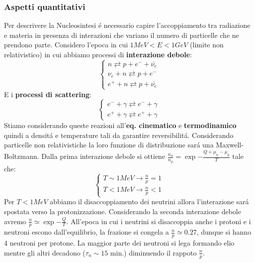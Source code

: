 \documentclass[12pt, a4paper]{article}
\begin{document}
\subsubsection{Aspetti quantitativi}
Per descrivere la Nucleosintesi \'{e} necessario capire l'accoppiamento tra radiazione e materia in presenza di interazioni che variano il numero di particelle che ne prendono parte. Considero l'epoca in cui $1MeV<E<1GeV$ (limite non relativistico) in cui abbiamo processi di \textbf{interazione debole}:
\begin{equation}
    \begin{cases}
    n \rightleftarrows p + e^{-} + \bar{\nu_e}
    \\
    \nu_{e}+n \rightleftarrows p +e^{-}
    \\
    e^{+} + n\rightleftarrows p + \bar{\nu_e}
    \end{cases}
\end{equation}
E i \textbf{processi di scattering}:
\begin{equation}
    \begin{cases}
    e^{-} + \gamma \rightleftarrows e^{-} + \gamma
    \\
    e^{+} + \gamma \rightleftarrows e^{+} + \gamma
    \end{cases}
\end{equation}
Stiamo considerando queste reazioni all'\textbf{eq. cinematico} e \textbf{termodinamico} quindi a densit\'{a} e temperature tali da garantire reversibilit\'{a}. Considerando particelle non relativistiche la loro funzione di distribuzione sar\'{a} una Maxwell-Boltzmann. Dalla prima interazione debole si ottiene $\frac{n_n}{n_p} = \exp{-\frac{Q + \mu_n -\mu_p}{T}}$ tale che:\\
\begin{equation}
    \begin{cases}
    T \sim 1MeV \rightarrow \frac{n}{p}=1
    \\
    T < 1MeV \rightarrow \frac{n}{p}<1
    \end{cases}
\end{equation}
Per $T < 1MeV$ abbiamo il disaccoppiamento dei neutrini allora l'interazione sar\'{a} spostata verso la protonizzazione. Considerando la seconda interazione debole avremo $\frac{n}{p} \simeq \exp{-\frac{Q }{T}}$. All'epoca in cui i neutrini si disaccoppia anche i protoni e i neutroni escono dall'equilibrio, la frazione si congela a $\frac{n}{p} \simeq 0.27$, dunque si hanno 4 neutroni per protone. La maggior parte dei neutroni si lega formando elio mentre gli altri decadono ($\tau_n\sim 15$ min.) diminuendo il rappoto $\frac{n}{p}$.\\
\end{document}
